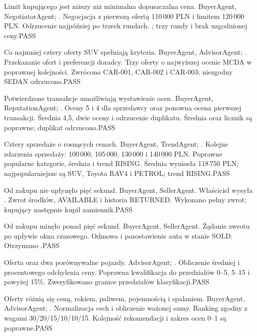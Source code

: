 {Limit kupującego jest niższy niż minimalna dopuszczalna cena.}
{BuyerAgent, NegotiatorAgent; .}
{Negocjacja z pierwszą ofertą 110\,000 PLN i limitem 120\,000 PLN.}
{Odrzucenie najpóźniej po trzech rundach.}
{; trzy rundy i brak uzgodnionej ceny.}{PASS}

{Co najmniej cztery oferty SUV spełniają kryteria.}
{BuyerAgent, AdvisorAgent; .}
{Przekazanie ofert i preferencji doradcy.}
{Trzy oferty o najwyższej ocenie MCDA w poprawnej kolejności.}
{Zwrócono CAR-001, CAR-002 i CAR-003; niezgodny SEDAN odrzucono.}{PASS}

{Potwierdzone transakcje umożliwiają wystawienie ocen.}
{BuyerAgent, ReputationAgent; .}
{Oceny 5 i 4 dla sprzedawcy oraz ponowna ocena pierwszej transakcji.}
{Średnia 4,5, dwie oceny i odrzucenie duplikatu.}
{Średnia oraz licznik są poprawne; duplikat odrzucono.}{PASS}

{Cztery sprzedaże o rosnących cenach.}
{BuyerAgent, TrendAgent; .}
{Kolejne zdarzenia sprzedaży: 100\,000, 105\,000, 130\,000 i 140\,000 PLN.}
{Poprawne popularne kategorie, średnia i trend RISING.}
{Średnia wyniosła 118\,750 PLN; najpopularniejsze są SUV,
Toyota RAV4 i PETROL; trend RISING.}{PASS}

{Od zakupu nie upłynęło pięć sekund.}
{BuyerAgent, SellerAgent.}
{Właściciel wysyła .}
{Zwrot środków, AVAILABLE i historia RETURNED.}
{Wykonano pełny zwrot; kupujący następnie kupił zamiennik.}{PASS}

{Od zakupu minęło ponad pięć sekund.}
{BuyerAgent, SellerAgent.}
{Żądanie zwrotu po upływie okna czasowego.}
{Odmowa i pozostawienie auta w stanie SOLD.}
{Otrzymano .}{PASS}

{Oferta oraz dwa porównywalne pojazdy.}
{AdvisorAgent; .}
{Obliczenie średniej i procentowego odchylenia ceny.}
{Poprawna kwalifikacja do przedziałów 0--5, 5--15 i powyżej 15\%.}
{Zweryfikowano granice przedziałów klasyfikacji.}{PASS}

{Oferty różnią się ceną, rokiem, paliwem, pojemnością i spalaniem.}
{BuyerAgent, AdvisorAgent; .}
{Normalizacja cech i obliczenie ważonej sumy.}
{Ranking zgodny z wagami 30/20/15/10/10/15.}
{Kolejność rekomendacji i zakres ocen 0--1 są poprawne.}{PASS}

